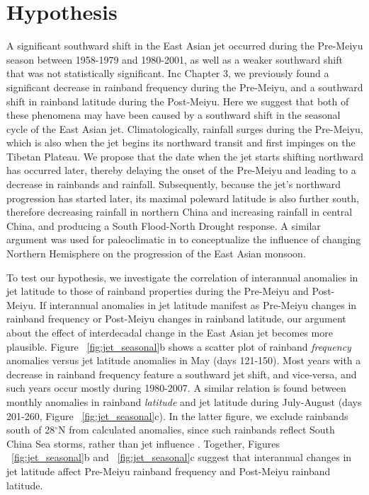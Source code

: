 \section{Hypothesis}

	A significant southward shift in the East Asian jet occurred during the Pre-Meiyu season between 1958-1979 and 1980-2001, as well as a weaker southward shift that was not statistically significant. Inc Chapter 3, we previously found a significant decrease in rainband frequency during the Pre-Meiyu, and a southward shift in rainband latitude during the Post-Meiyu. Here we suggest that both of these phenomena may have been caused by a southward shift in the seasonal cycle of the East Asian jet. Climatologically, rainfall surges during the Pre-Meiyu, which is also when the jet begins its northward transit and first impinges on the Tibetan Plateau. We propose that the date when the jet starts shifting northward has occurred later, thereby delaying the onset of the Pre-Meiyu and leading to a decrease in rainbands and rainfall. Subsequently, because the jet's northward progression has started later, its maximal poleward latitude is also further south, therefore decreasing rainfall in northern China and increasing rainfall in central China, and producing a South Flood-North Drought response. A similar argument was used for paleoclimatic in \citet{Chiang2015} to conceptualize the influence of changing Northern Hemisphere on the progression of the East Asian monsoon.
	
	To test our hypothesis, we investigate the correlation of interannual anomalies in jet latitude to those of rainband properties during the Pre-Meiyu and Post-Meiyu. If interannual anomalies in jet latitude manifest as Pre-Meiyu changes in rainband frequency or Post-Meiyu changes in rainband latitude, our argument about the effect of interdecadal change in the East Asian jet becomes more plausible. Figure ~\ref{fig:jet_seasonal}b shows a scatter plot of rainband \textit{frequency} anomalies versus jet latitude anomalies in May (days 121-150). Most years with a decrease in rainband frequency feature a southward jet shift, and vice-versa, and such years occur mostly during 1980-2007. A similar relation is found between monthly anomalies in rainband \textit{latitude} and jet latitude during July-August (days 201-260, Figure ~\ref{fig:jet_seasonal}c). In the latter figure, we exclude rainbands south of 28$^{\circ}$N from calculated anomalies, since such rainbands reflect South China Sea storms, rather than jet influence \citep{Day2015}. Together, Figures ~\ref{fig:jet_seasonal}b and ~\ref{fig:jet_seasonal}c suggest that interannual changes in jet latitude affect Pre-Meiyu rainband frequency and Post-Meiyu rainband latitude.
	
